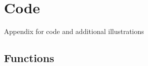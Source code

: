 \documentclass[aodsor,preprint]{imsart}
\numberwithin{equation}{section}
\theoremstyle{plain}
\begin{document}
\newpage

\appendix


\section{Code}
\label{sec:app}

Appendix for code and additional illustrations

\subsection{Functions}






\newpage
\printbibliography
\end{document}
